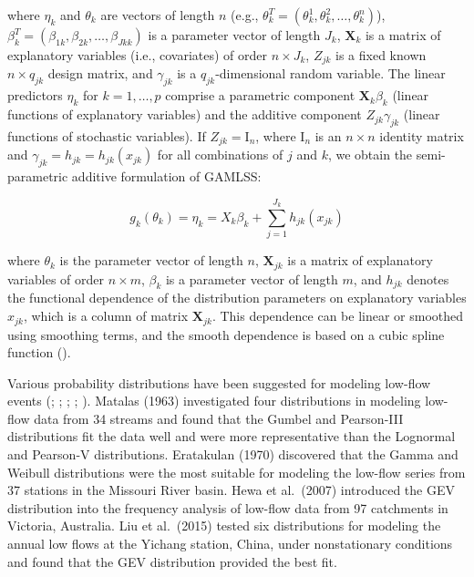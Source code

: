 \documentclass[
]{krantz}
\begin{document}
where \(\eta_{k}\) and \(\theta_{k}\) are vectors of length \(n\) (e.g., \(\theta_{k}^{T} = (\theta_{k}^{1}, \theta_{k}^{2}, \ldots, \theta_{k}^{n})\)), \(\beta_{k}^{T} = (\beta_{1k}, \beta_{2k}, \ldots, \beta_{Jkk})\) is a parameter vector of length \(J_{k}\), \(\mathbf{X}_{k}\) is a matrix of explanatory variables (i.e., covariates) of order \(n \times J_{k}\), \(Z_{jk}\) is a fixed known \(n \times q_{jk}\) design matrix, and \(\gamma_{jk}\) is a \(q_{jk}\)-dimensional random variable. The linear predictors \(\eta_{k}\) for \(k = 1, \ldots, p\) comprise a parametric component \(\mathbf{X}_{k} \beta_{k}\) (linear functions of explanatory variables) and the additive component \(Z_{jk} \gamma_{jk}\) (linear functions of stochastic variables). If \(Z_{jk} = \mathrm{I}_{n}\), where \(\mathrm{I}_{n}\) is an \(n \times n\) identity matrix and \(\gamma_{jk} = h_{jk} = h_{jk}(x_{jk})\) for all combinations of \(j\) and \(k\), we obtain the semi-parametric additive formulation of GAMLSS:

\[
g_{k}(\theta_{k}) = \eta_{k} = X_{k} \beta_{k} + \sum_{j=1}^{J_{k}} h_{jk}(x_{jk})\tag{17}
\]

where \(\theta_{k}\) is the parameter vector of length \(n\), \(\mathbf{X}_{jk}\) is a matrix of explanatory variables of order \(n \times m\), \(\beta_{k}\) is a parameter vector of length \(m\), and \(h_{jk}\) denotes the functional dependence of the distribution parameters on explanatory variables \(x_{jk}\), which is a column of matrix \(\mathbf{X}_{jk}\). This dependence can be linear or smoothed using smoothing terms, and the smooth dependence is based on a cubic spline function (\citet{Lopez2013}).

Various probability distributions have been suggested for modeling low-flow events (\citet{Matalas1963}; \citet{Eratakulan1970}; \citet{Smakhtin2001}; \citet{Hewa2007}; \citet{Liu2015}). Matalas (1963) investigated four distributions in modeling low-flow data from 34 streams and found that the Gumbel and Pearson-III distributions fit the data well and were more representative than the Lognormal and Pearson-V distributions. Eratakulan (1970) discovered that the Gamma and Weibull distributions were the most suitable for modeling the low-flow series from 37 stations in the Missouri River basin. Hewa et al.~(2007) introduced the GEV distribution into the frequency analysis of low-flow data from 97 catchments in Victoria, Australia. Liu et al.~(2015) tested six distributions for modeling the annual low flows at the Yichang station, China, under nonstationary conditions and found that the GEV distribution provided the best fit.
\end{document}
